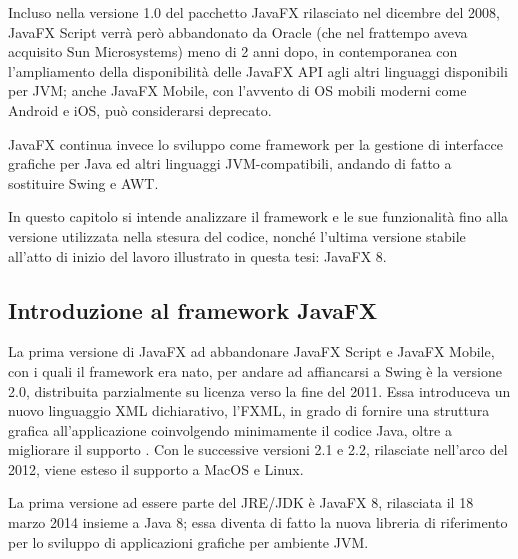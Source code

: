         Incluso nella versione 1.0 del pacchetto JavaFX rilasciato nel dicembre del 2008, JavaFX Script verrà però abbandonato da Oracle (che nel frattempo aveva acquisito Sun Microsystems) meno di 2 anni dopo, in contemporanea con l'ampliamento della disponibilità delle JavaFX API agli altri linguaggi disponibili per JVM; anche JavaFX Mobile, con l'avvento di OS mobili moderni come Android e iOS, può considerarsi deprecato.

        JavaFX continua invece lo sviluppo come framework per la gestione di interfacce grafiche per Java ed altri linguaggi JVM-compatibili, andando di fatto a sostituire Swing e AWT.

        In questo capitolo si intende analizzare il framework e le sue funzionalità fino alla versione utilizzata nella stesura del codice, nonché l'ultima versione stabile all'atto di inizio del lavoro illustrato in questa tesi: JavaFX 8.

        \subsection{Introduzione al framework JavaFX}\label{sub:jfxIntro}
            La prima versione di JavaFX ad abbandonare JavaFX Script e JavaFX Mobile, con i quali il framework era nato, per andare ad affiancarsi a Swing è la versione 2.0, distribuita parzialmente su licenza  verso la fine del 2011.
            Essa introduceva un nuovo linguaggio XML dichiarativo, l'FXML, in grado di fornire una struttura grafica all'applicazione coinvolgendo minimamente il codice Java, oltre a migliorare il supporto .
            Con le successive versioni 2.1 e 2.2, rilasciate nell'arco del 2012, viene esteso il supporto a MacOS e Linux.

            La prima versione ad essere parte del JRE/JDK è JavaFX 8, rilasciata il 18 marzo 2014 insieme a Java 8; essa diventa di fatto la nuova libreria di riferimento per lo sviluppo di applicazioni grafiche per ambiente JVM.


